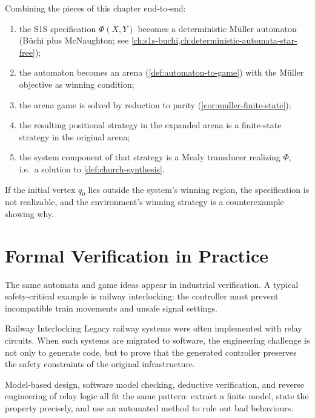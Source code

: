 \begin{formaldetails}
\label{formal:mealy-from-strategy}
Combining the pieces of this chapter end-to-end:
\begin{enumerate}[nosep]
  \item the S1S specification $\Phi(X,Y)$ becomes a deterministic
        M\"uller automaton (B\"uchi plus McNaughton; see
        \cref{ch:s1s-buchi,ch:deterministic-automata-star-free});
  \item the automaton becomes an arena (\cref{def:automaton-to-game})
        with the M\"uller objective as winning condition;
  \item the arena game is solved by reduction to parity
        (\cref{cor:muller-finite-state});
  \item the resulting positional strategy in the expanded arena is a
        finite-state strategy in the original arena;
  \item the system component of that strategy is a Mealy transducer
        realizing $\Phi$, i.e.\ a solution to \cref{def:church-synthesis}.
\end{enumerate}
If the initial vertex $q_0$ lies outside the system's winning region,
the specification is not realizable, and the environment's winning
strategy is a counterexample showing why.
\end{formaldetails}


\section{Formal Verification in Practice}
\label{sec:formal-verification-practice}

The same automata and game ideas appear in industrial verification.  A
typical safety-critical example is railway interlocking: the controller
must prevent incompatible train movements and unsafe signal settings.

\begin{intermezzo}{Railway Interlocking}
Legacy railway systems were often implemented with relay circuits.  When
such systems are migrated to software, the engineering challenge is not
only to generate code, but to prove that the generated controller
preserves the safety constraints of the original infrastructure.

Model-based design, software model checking, deductive verification, and
reverse engineering of relay logic all fit the same pattern: extract a
finite model, state the property precisely, and use an automated method
to rule out bad behaviours.
\end{intermezzo}

